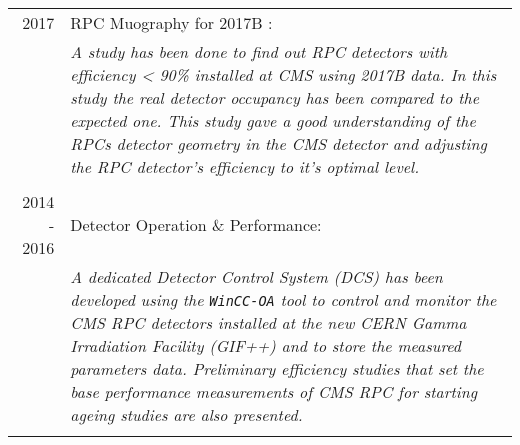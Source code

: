 \documentclass[a4paper,10pt]{article}
\begin{document}
\begin{tabular}{r|p{11.60cm}}
\quad \textsc{2017} & RPC Muography for 2017B :\\&\emph{A study has been done to find out RPC detectors with efficiency < 90\% installed at CMS using 2017B data. In this study the real detector occupancy has been compared to the expected one. This study gave a good understanding of the RPCs detector geometry in the CMS detector and adjusting the RPC detector's efficiency to it's optimal level.}\\\multicolumn{2}{c}{} \\


 \textsc{2014 - 2016} & Detector Operation \& Performance:\\&\emph{A dedicated Detector Control System (DCS) has been developed using the \texttt{WinCC-OA} tool to control and monitor the CMS RPC detectors installed at the new CERN Gamma Irradiation Facility (GIF++) and to store the measured parameters data. Preliminary efficiency studies that set the base performance measurements of CMS RPC for starting ageing studies are also presented.}\\\multicolumn{2}{c}{} 
\end{tabular}

\end{document}
